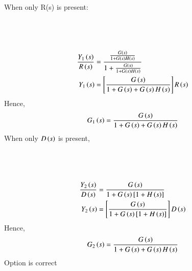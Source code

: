 \documentclass[journal,12pt,onecolumn]{IEEEtran}
\theoremstyle{remark}
\begin{document}
When only R(s) is present:\\
\begin{figure}[ht!]
\centering

\end{figure}\\
\begin{figure}[ht!]
\centering

\end{figure}\\
\begin{align}
\frac{Y_1\left(s\right)}{R\left(s\right)} &= \frac{\frac{G\left(s\right)}{1+ G\left(s\right)H\left(s\right)}}{1+ \frac{G\left(s\right)}{1+G\left(s\right)H\left(s\right)}}\\
Y_1\left(s\right) &= \left[\frac{G\left(s\right)}{1+ G\left(s\right)+ G\left(s\right)H\left(s\right)}\right] R\left(s\right)
\end{align}
Hence,
\begin{align}
 G_1\left(s\right) = \frac{G\left(s\right)}{1+G\left(s\right)+G\left(s\right)H\left(s\right)}
\end{align}
When only $D\left(s\right)$ is present,
\begin{figure}[ht!]
\centering

\end{figure}\\
\begin{figure}[ht!]
\centering

\end{figure}\\
\begin{align}
\frac{Y_2\left(s\right)}{D\left(s\right)} &= \frac{G\left(s\right)}{1+G\left(s\right)\left[1+ H\left(s\right)\right]}\\
Y_2\left(s\right)&= \left[ \frac{G\left(s\right)}{1+G\left(s\right)\left[1+H\left(s\right)\right]}\right]D\left(s\right)
\end{align}
Hence, 
\begin{align}
G_2\left(s\right) = \frac{G\left(s\right)}{1+ G\left(s\right)+ G\left(s\right)H\left(s\right)}
\end{align}
Option  is correct
\end{document}
